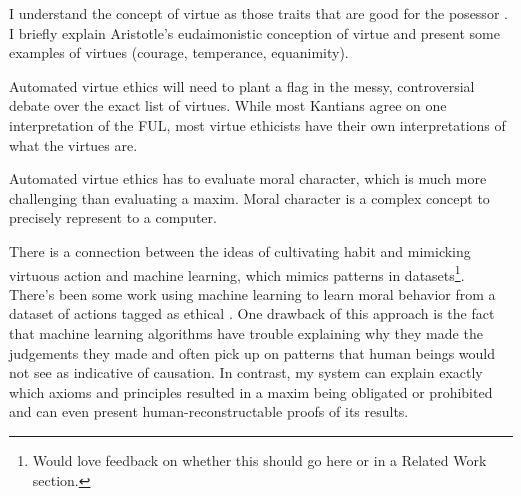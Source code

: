 \begin{isabellebody}
{}
\isamarkuptrue%
%
\endisatagdocument
{\isafolddocument}%
%
\isadelimdocument
%
\endisadelimdocument
%
\begin{isamarkuptext}%
I understand the concept of virtue as those traits that are 
good for the posessor \cite{vesep}. I briefly explain Aristotle's eudaimonistic conception of virtue and present
some examples of virtues (courage, temperance, equanimity).%
\end{isamarkuptext}\isamarkuptrue%
%
\isadelimdocument
%
\endisadelimdocument
%
\isatagdocument
%
\isamarkuptrue%
%
\isamarkuptrue%
%
\endisatagdocument
{\isafolddocument}%
%
\isadelimdocument
%
\endisadelimdocument
%
\begin{isamarkuptext}%
Automated virtue ethics will need to plant a flag in the messy, controversial debate over the exact
list of virtues. While most Kantians agree on one interpretation of the FUL, most virtue ethicists 
have their own interpretations of what the virtues are.%
\end{isamarkuptext}\isamarkuptrue%
%
\isadelimdocument
%
\endisadelimdocument
%
\isatagdocument
%
\isamarkuptrue%
%
\endisatagdocument
{\isafolddocument}%
%
\isadelimdocument
%
\endisadelimdocument
%
\begin{isamarkuptext}%
Automated virtue ethics has to evaluate moral character, which is much more challenging than 
evaluating a maxim. Moral character is a complex concept to precisely represent to a computer.%
\end{isamarkuptext}\isamarkuptrue%
%
\isadelimdocument
%
\endisadelimdocument
%
\isatagdocument
%
\isamarkuptrue%
%
\endisatagdocument
{\isafolddocument}%
%
\isadelimdocument
%
\endisadelimdocument
%
\begin{isamarkuptext}%
There is a connection between the ideas of cultivating habit and mimicking virtuous action
and machine learning, which mimics patterns in datasets\footnote{Would love feedback on whether this should
go here or in a Related Work section.}. There's been some
work using machine learning to learn moral behavior from a dataset of actions tagged as ethical \cite{delphi}. 
One drawback of this approach is the fact that machine learning algorithms have trouble
explaining why they made the judgements they made and often pick up on patterns that human beings would 
not see as indicative of causation. In contrast,
my system can explain exactly which axioms and principles resulted in a maxim being obligated or prohibited
and can even present human-reconstructable proofs of its results.%
\end{isamarkuptext}\isamarkuptrue%
%
\isadelimtheory
%
\endisadelimtheory
%
\isatagtheory
%
\endisatagtheory
{\isafoldtheory}%
%
\isadelimtheory
%
\endisadelimtheory
%
\end{isabellebody}%
